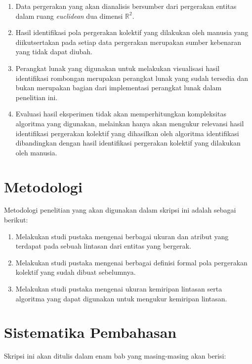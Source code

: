 \begin{enumerate}
    \item Data pergerakan yang akan dianalisis bersumber dari pergerakan entitas dalam ruang \textit{euclidean} dua dimensi $\mathbb{R}^2$.
    \item Hasil identifikasi pola pergerakan kolektif yang dilakukan oleh manusia yang diikutsertakan pada setiap data pergerakan merupakan sumber kebenaran yang tidak dapat diubah.
    \item Perangkat lunak yang digunakan untuk melakukan visualisasi hasil identifikasi rombongan merupakan perangkat lunak yang sudah tersedia dan bukan merupakan bagian dari implementasi perangkat lunak dalam penelitian ini.
    \item Evaluasi hasil eksperimen tidak akan memperhitungkan kompleksitas algoritma yang digunakan, melainkan hanya akan mengukur relevansi hasil identifikasi pergerakan kolektif yang dihasilkan oleh algoritma identifikasi dibandingkan dengan hasil identifikasi pergerakan kolektif yang dilakukan oleh manusia.
\end{enumerate}

\section{Metodologi}
\label{sec:metlit}

Metodologi penelitian yang akan digunakan dalam skripsi ini adalah sebagai berikut:

\begin{enumerate}
    \item Melakukan studi pustaka mengenai berbagai ukuran dan atribut yang terdapat pada sebuah lintasan dari entitas yang bergerak.
    \item Melakukan studi pustaka mengenai berbagai definisi formal pola pergerakan kolektif yang sudah dibuat sebelumnya.
    \item Melakukan studi pustaka mengenai ukuran kemiripan lintasan serta algoritma yang dapat digunakan untuk mengukur kemiripan lintasan.
\end{enumerate}

\section{Sistematika Pembahasan}
\label{sec:sispem}

Skripsi ini akan ditulis dalam enam bab yang masing-masing akan berisi:

